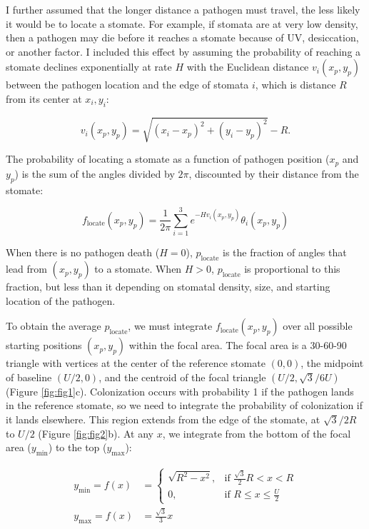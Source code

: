 \documentclass[utf8]{frontiersSCNS}
\begin{document}
I further assumed that the longer distance a pathogen must travel, the
less likely it would be to locate a stomate. For example, if stomata are
at very low density, then a pathogen may die before it reaches a stomate
because of UV, desiccation, or another factor. I included this effect by
assuming the probability of reaching a stomate declines exponentially at
rate \(H\) with the Euclidean distance \(v_i(x_p,y_p)\) between the
pathogen location and the edge of stomata \(i\), which is distance \(R\)
from its center at \(x_i,y_i\):

\begin{equation}
  v_i(x_p,y_p) = \sqrt{(x_i - x_p) ^ 2 + (y_i - y_p) ^ 2} - R.
\end{equation}

The probability of locating a stomate as a function of pathogen position
(\(x_p\) and \(y_p\)) is the sum of the angles divided by \(2\pi\),
discounted by their distance from the stomate:

\begin{equation}
  f_\text{locate}(x_p,y_p) = \frac{1}{2 \pi} \sum_{i=1}^3 e^{-H v_i(x_p,y_p)} \theta_i(x_p,y_p)
\end{equation}

When there is no pathogen death (\(H = 0\)), \(p_\text{locate}\) is the
fraction of angles that lead from \((x_p,y_p)\) to a stomate. When
\(H > 0\), \(p_\text{locate}\) is proportional to this fraction, but
less than it depending on stomatal density, size, and starting location
of the pathogen.

To obtain the average \(p_\text{locate}\), we must integrate
\(f_\text{locate}(x_p,y_p)\) over all possible starting positions
\((x_p,y_p)\) within the focal area. The focal area is a 30-60-90
triangle with vertices at the center of the reference stomate \((0,0)\),
the midpoint of baseline \((U/2,0)\), and the centroid of the focal
triangle \((U/2, \sqrt{3} / 6 U)\) (Figure \ref{fig:fig1}c).
Colonization occurs with probability 1 if the pathogen lands in the
reference stomate, so we need to integrate the probability of
colonization if it lands elsewhere. This region extends from the edge of
the stomate, at \(\sqrt{3} / 2 R\) to \(U/2\) (Figure \ref{fig:fig2}b).
At any \(x\), we integrate from the bottom of the focal area
(\(y_\text{min}\)) to the top (\(y_\text{max}\)):

\begin{align}
  y_\text{min} = f(x) & = \begin{cases}
    \sqrt{R ^ 2 - x ^ 2}, & \text{if } \frac{\sqrt{3}}{2} R < x < R \\ 
    0, & \text{if } R \leq x \leq \frac{U}{2} \end{cases} \\
  y_\text{max} = f(x) & = \frac{\sqrt{3}}{3} x
\end{align}
\end{document}
